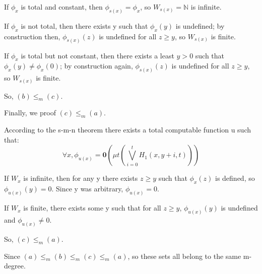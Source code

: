 \documentclass[12pt,a4paper]{article}
\theoremstyle{definition}
\numberwithin{equation}{section}
\numberwithin{figure}{section}
\begin{document}
\begin{enumerate}
If $\phi_x$ is total and constant, then $\phi_{s(x)} = \phi_x$, so $W_{s(x)} = \mathbb{N}$ is infinite.

If $\phi_x$ is not total, then there exists y such that $\phi_x(y)$ is undefined; by construction then, $\phi_{s(x)}(z)$ is undefined
for all $z \geq y$, so $W_{s(x)}$ is finite.

If $\phi_x$ is total but not constant, then there exists a least $y>0$ such that $\phi_x(y) \neq \phi_x(0)$; by construction again, $\phi_{s(x)}(z)$ is undefined for all $z \geq y$, so $W_{s(x)}$ is finite.

So, $(b) \leq_m (c)$.

Finally, we proof $(c) \leq_m (a)$.

According to the s-m-n theorem there exists a total computable function u such that:
$$ \forall x, \phi_{u(x)} = \mathbf{0}(\mu t(\bigvee_{i=0}^{t}H_1(x,y+i,t)))$$

If $W_x$ is infinite, then for any y there exists $z \geq y$ such that $\phi_x(z)$ is defined, so $\phi_{u(x)}(y)=0$. Since y was arbitrary, $\phi_{u(x)} = 0$.

If $W_x$ is finite, there exists some y such that for all $z \geq y$, $\phi_{u(x)}(y)$ is undefined and $\phi_{u(x)} \neq 0$.

So, $(c) \leq_m (a)$.

Since $(a) \leq_m (b) \leq_m (c) \leq_m (a)$, so these sets all belong to the same m-degree.


\end{enumerate}
\end{document}
